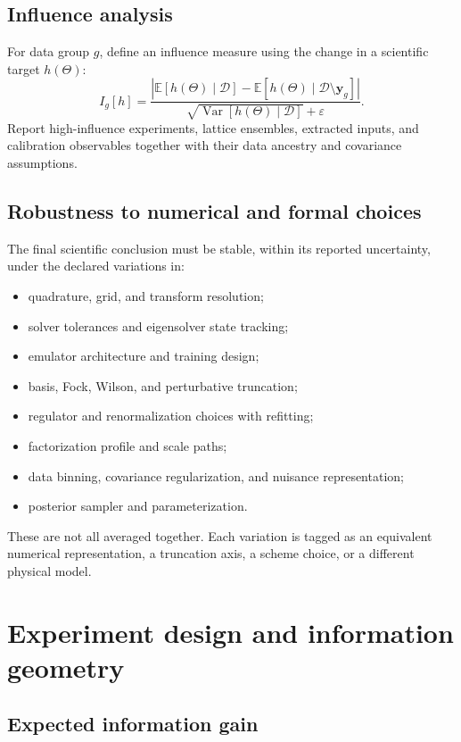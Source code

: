 \documentclass[11pt]{article}
\newcommand{\Var}{\operatorname{Var}}
\newcommand{\E}{\mathbb E}
\newcommand{\eps}{\varepsilon}
\newcommand{\abs}[1]{\left|#1\right|}
\newcommand{\allData}{\mathcal D}
\begin{document}
\subsection{Influence analysis}

For data group \(g\), define an influence measure using the change in a
scientific target \(h(\Theta)\):
\begin{equation}
 I_g[h]
 =
 \frac{
 \abs{
 \E[h(\Theta)\mid\allData]
 -
 \E[h(\Theta)\mid\allData\setminus\bm y_g]
 }
 }{
 \sqrt{\Var[h(\Theta)\mid\allData]}+\eps
 } .
 \label{eq:group-influence}
\end{equation}
Report high-influence experiments, lattice ensembles, extracted inputs, and
calibration observables together with their data ancestry and covariance
assumptions.

\subsection{Robustness to numerical and formal choices}

The final scientific conclusion must be stable, within its reported
uncertainty, under the declared variations in:
\begin{itemize}
\item quadrature, grid, and transform resolution;
\item solver tolerances and eigensolver state tracking;
\item emulator architecture and training design;
\item basis, Fock, Wilson, and perturbative truncation;
\item regulator and renormalization choices with refitting;
\item factorization profile and scale paths;
\item data binning, covariance regularization, and nuisance representation;
\item posterior sampler and parameterization.
\end{itemize}
These are not all averaged together.  Each variation is tagged as an
equivalent numerical representation, a truncation axis, a scheme choice, or a
different physical model.

\section{Experiment design and information geometry}
\label{sec:design}

\subsection{Expected information gain}
\end{document}
